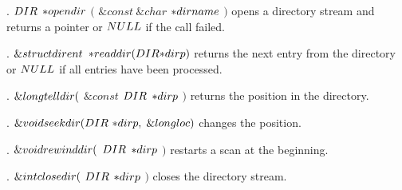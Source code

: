 . \CD{}$\\{DIR}$ ${{*}}\\{opendir}$ $($ $\&{const}\ \&{char}$ ${{*}}%
\\{dirname}$ $)$\DC{} opens a directory stream and returns a pointer or \CD{}$%
\\{NULL}$\DC{}
if the call failed.

\fi

. \CD{}$\&{struct}\ \\{dirent}$ ${{*}}\\{readdir}(\\{DIR}{*}\\{dirp})$\DC{}
returns the next entry from the directory or \CD{}$\\{NULL}$\DC{}
if all entries have been processed.

\fi

. \CD{}$\&{long}\ \\{telldir}($ $\&{const}$ $\\{DIR}$ ${{*}}\\{dirp}$ $)$%
\DC{} returns the position in the directory.

\fi

. \CD{}$\&{void}\ \\{seekdir}(\\{DIR}\ {{*}}\\{dirp},\;\&{long}\ \\{loc})$%
\DC{} changes the position.

\fi

. \CD{}$\&{void}\ \\{rewinddir}($ $\\{DIR}$ ${{*}}\\{dirp}$ $)$\DC{}
restarts a scan at the beginning.

\fi

. \CD{}$\&{int}\ \\{closedir}($ $\\{DIR}$ ${{*}}\\{dirp}$ $)$\DC{} closes
the directory stream.

\fi

